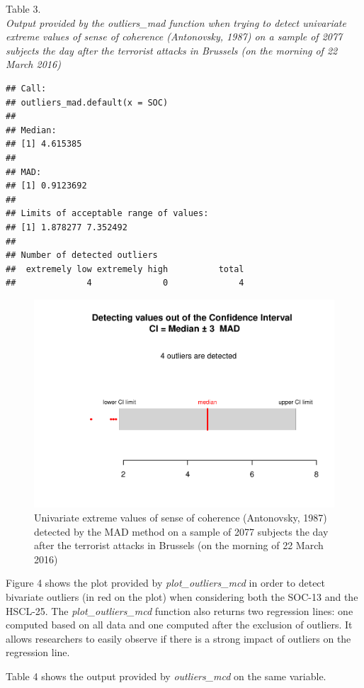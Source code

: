 \documentclass[man,floatsintext]{apa6}
\begin{document}
Table 3.\\
\emph{Output provided by the outliers\_mad function when trying to detect univariate extreme values of sense of coherence (Antonovsky, 1987) on a sample of 2077 subjects the day after the terrorist attacks in Brussels (on the morning of 22 March 2016)}

\begin{verbatim}
## Call:
## outliers_mad.default(x = SOC)
## 
## Median:
## [1] 4.615385
## 
## MAD:
## [1] 0.9123692
## 
## Limits of acceptable range of values:
## [1] 1.878277 7.352492
## 
## Number of detected outliers
##  extremely low extremely high          total 
##              4              0              4
\end{verbatim}

\begin{figure}
\centering
\includegraphics{Outliers_files/figure-latex/MADSOC-1.pdf}
\caption{\label{fig:MADSOC}Univariate extreme values of sense of coherence (Antonovsky, 1987) detected by the MAD method on a sample of 2077 subjects the day after the terrorist attacks in Brussels (on the morning of 22 March 2016)}
\end{figure}

Figure 4 shows the plot provided by \emph{plot\_outliers\_mcd} in order to detect bivariate outliers (in red on the plot) when considering both the SOC-13 and the HSCL-25. The \emph{plot\_outliers\_mcd} function also returns two regression lines: one computed based on all data and one computed after the exclusion of outliers. It allows researchers to easily observe if there is a strong impact of outliers on the regression line.

Table 4 shows the output provided by \emph{outliers\_mcd} on the same variable.
\end{document}
